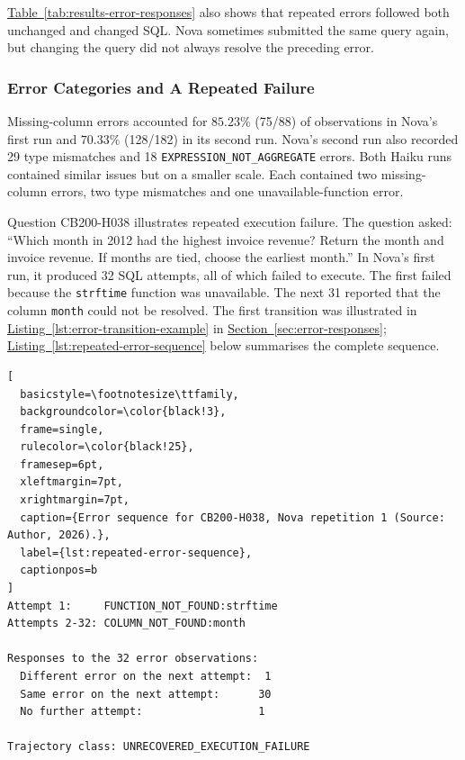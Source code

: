 \hyperref[tab:results-error-responses]{Table~\ref*{tab:results-error-responses}} 
also shows that repeated errors followed both unchanged and
changed SQL. Nova sometimes submitted the same query again, but changing
the query did not always resolve the preceding error.

\subsubsection{Error Categories and A Repeated Failure}

Missing-column errors accounted for $85.23\%$ (75/88) of observations
in Nova's first run and $70.33\%$ (128/182) in its second run.
Nova's second run also recorded 29 type mismatches and 18 \texttt{EXPRESSION\_NOT\_AGGREGATE} errors.
Both Haiku runs contained similar issues but on a smaller scale.
Each contained two missing-column errors, two type mismatches and one unavailable-function error. 

Question CB200-H038 illustrates repeated execution failure.
The question asked: ``Which month in 2012 had the highest invoice revenue?
Return the month and invoice revenue. If months are tied, choose the earliest month.''
In Nova's first run, it produced 32 SQL attempts, all of which failed to execute.
The first failed because the \texttt{strftime} function was unavailable. 
The next 31 reported that the column \texttt{month} could not be resolved.
The first transition was illustrated in
\hyperref[lst:error-transition-example]{Listing~\ref*{lst:error-transition-example}}
in \hyperref[sec:error-responses]{Section~\ref*{sec:error-responses}};
\hyperref[lst:repeated-error-sequence]{Listing~\ref*{lst:repeated-error-sequence}}
below summarises the complete sequence.

\noindent\begin{minipage}{\linewidth}
\begin{lstlisting}[
  basicstyle=\footnotesize\ttfamily,
  backgroundcolor=\color{black!3},
  frame=single,
  rulecolor=\color{black!25},
  framesep=6pt,
  xleftmargin=7pt,
  xrightmargin=7pt,
  caption={Error sequence for CB200-H038, Nova repetition 1 (Source: Author, 2026).},
  label={lst:repeated-error-sequence},
  captionpos=b
]
Attempt 1:     FUNCTION_NOT_FOUND:strftime
Attempts 2-32: COLUMN_NOT_FOUND:month

Responses to the 32 error observations:
  Different error on the next attempt:  1
  Same error on the next attempt:      30
  No further attempt:                  1

Trajectory class: UNRECOVERED_EXECUTION_FAILURE
\end{lstlisting}
\end{minipage}

